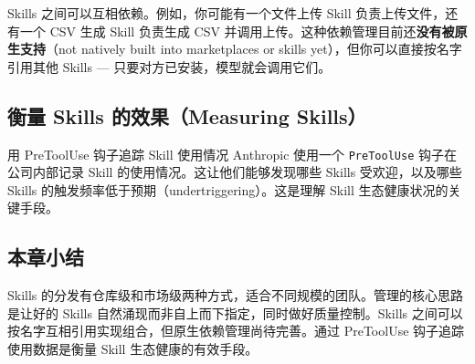 Skills 之间可以互相依赖。例如，你可能有一个文件上传 Skill 负责上传文件，还有一个 CSV 生成 Skill 负责生成 CSV 并调用上传。这种依赖管理目前还\textbf{没有被原生支持}（not natively built into marketplaces or skills yet），但你可以直接按名字引用其他 Skills --- 只要对方已安装，模型就会调用它们。

\subsection{衡量 Skills 的效果（Measuring Skills）}

\begin{importantbox}{用 PreToolUse 钩子追踪 Skill 使用情况}
Anthropic 使用一个 \texttt{PreToolUse} 钩子在公司内部记录 Skill 的使用情况。这让他们能够发现哪些 Skills 受欢迎，以及哪些 Skills 的触发频率低于预期（undertriggering）。这是理解 Skill 生态健康状况的关键手段。
\end{importantbox}

\subsection{本章小结}

Skills 的分发有仓库级和市场级两种方式，适合不同规模的团队。管理的核心思路是让好的 Skills 自然涌现而非自上而下指定，同时做好质量控制。Skills 之间可以按名字互相引用实现组合，但原生依赖管理尚待完善。通过 PreToolUse 钩子追踪使用数据是衡量 Skill 生态健康的有效手段。

